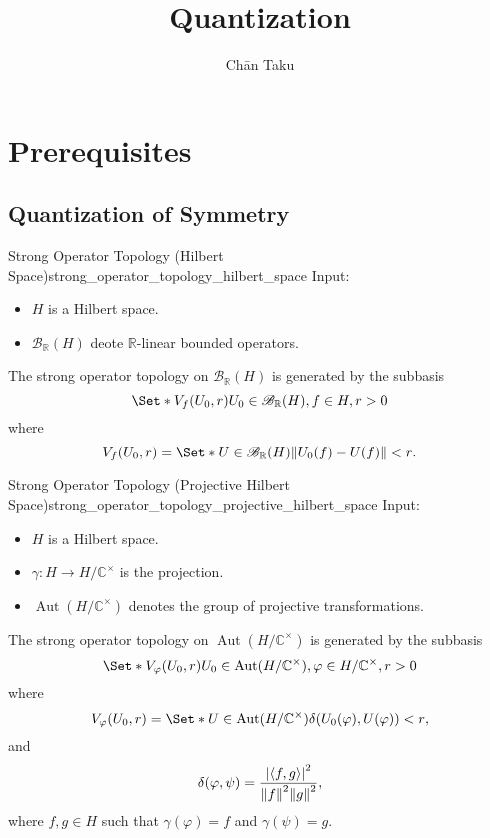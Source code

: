 \documentclass{article}
\title{Quantization}
\author{Ch\=an Taku}
\begin{document}
\maketitle

\section{Prerequisites}

\subsection{Quantization of Symmetry}

\begin{definition}{Strong Operator Topology (Hilbert Space)}{strong_operator_topology_hilbert_space}
    Input:
    \begin{itemize}
        \item $H$ is a Hilbert space.
        \item $\mathscr{B}_{\mathbb{R}}(H)$ deote $\mathbb{R}$-linear bounded operators.
    \end{itemize}
    The strong operator topology on $\mathscr{B}_{\mathbb{R}}(H)$ is generated by the subbasis
    \[ \Set*{V_f(U_0,r)}{U_0\in\mathscr{B}_{\mathbb{R}}(H), f\in H,r>0} \]
    where
    \[ V_f(U_0,r) = \Set*{U\in\mathscr{B}_{\mathbb{R}}(H)}{\norm{U_0(f) - U(f)} < r}. \]
\end{definition}

\begin{definition}{Strong Operator Topology (Projective Hilbert Space)}{strong_operator_topology_projective_hilbert_space}
    Input:
    \begin{itemize}
        \item $H$ is a Hilbert space.
        \item $\gamma: H\rightarrow H/\mathbb{C}^\times$ is the projection.
        \item $\operatorname{Aut}(H/\mathbb{C}^\times)$ denotes the group of projective transformations.
    \end{itemize}
    The strong operator topology on $\operatorname{Aut}(H/\mathbb{C}^\times)$ is generated by the subbasis
    \[ \Set*{V_\varphi(U_0,r)}{U_0\in\operatorname{Aut}(H/\mathbb{C}^\times), \varphi\in H/\mathbb{C}^\times,r>0} \]
    where
    \[ V_\varphi(U_0,r) = \Set*{U\in\operatorname{Aut}(H/\mathbb{C}^\times)}{\delta(U_0(\varphi),U(\varphi)) < r}, \]
    and
    \[ \delta(\varphi,\psi) = \frac{\abs{\langle f,g \rangle}^2}{\norm{f}^2 \norm{g}^2}, \]
    where $f,g\in H$ such that $\gamma(\varphi) = f$ and $\gamma(\psi) = g$.
\end{definition}
\end{document}
